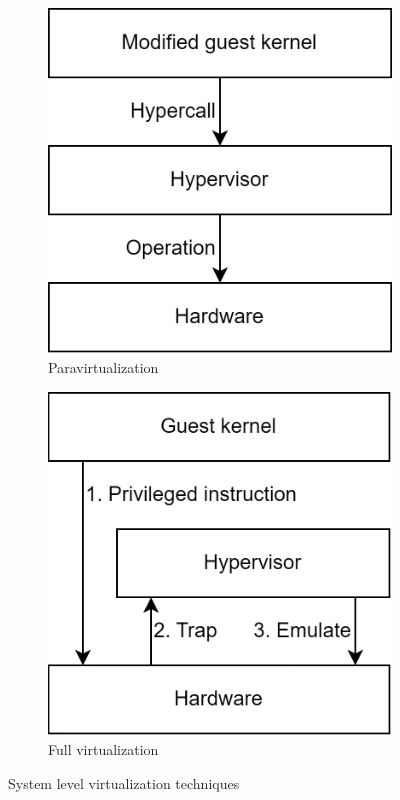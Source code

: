 \begin{figure}[H]
    \centering
    \begin{subfigure}{0.49\textwidth}
        \centering
        \includegraphics[width=0.75\linewidth]{images/para.png} 
        \caption{Paravirtualization}
    \end{subfigure}
    \begin{subfigure}{0.49\textwidth}
        \centering
        \includegraphics[width=0.75\linewidth]{images/full.png}
        \caption{Full virtualization}
    \end{subfigure}
    \caption{System level virtualization techniques}
\end{figure}